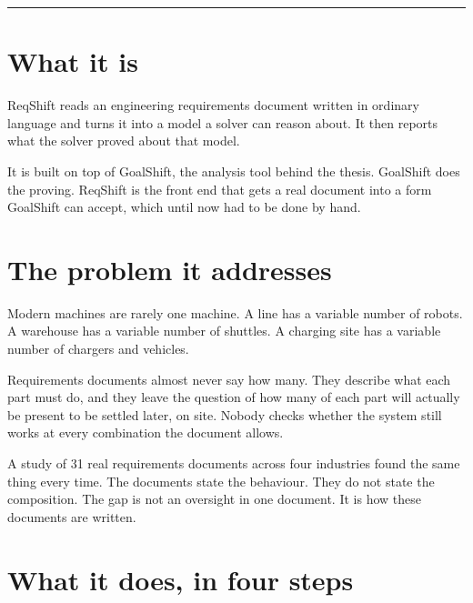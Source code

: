 \documentclass[11pt,a4paper]{article}
\begin{document}
\par
\vspace{3pt}
\par
\vspace{6pt}
\noindent\textcolor{rule}{\rule{\linewidth}{1pt}}

\section{What it is}

ReqShift reads an engineering requirements document written in ordinary language and
turns it into a model a solver can reason about. It then reports what the solver
proved about that model.

It is built on top of GoalShift, the analysis tool behind the thesis. GoalShift does
the proving. ReqShift is the front end that gets a real document into a form GoalShift
can accept, which until now had to be done by hand.

\section{The problem it addresses}

Modern machines are rarely one machine. A line has a variable number of robots. A
warehouse has a variable number of shuttles. A charging site has a variable number of
chargers and vehicles.

Requirements documents almost never say how many. They describe what each part must
do, and they leave the question of how many of each part will actually be present to
be settled later, on site. Nobody checks whether the system still works at every
combination the document allows.

\begin{keybox}
A study of 31 real requirements documents across four industries found the same thing
every time. The documents state the behaviour. They do not state the composition. The
gap is not an oversight in one document. It is how these documents are written.
\end{keybox}

\section{What it does, in four steps}
\end{document}
